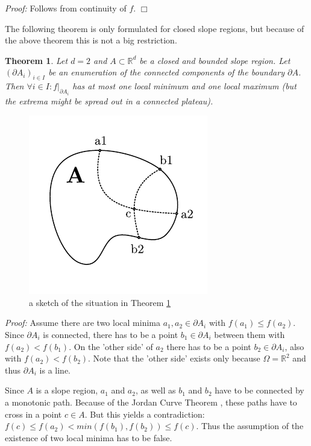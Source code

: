 \documentclass[11pt,twoside,twocolumn,a4paper]{article}
\theoremstyle{plain}
\newtheorem{thm}{Theorem}[section] %
\theoremstyle{definition}
\begin{document}
\emph{Proof:} Follows from continuity of $f$.
\hfill $\Box$

The following theorem is only formulated for closed slope regions, but because of the above theorem this is not a big restriction.

\begin{thm}
\label{uniqueminmax}
Let $d = 2$ and $A \subset \mathbb R^d$ be a closed and bounded slope region.
Let $(\partial A_i)_{i\in I}$ be an enumeration of the connected components of the boundary $\partial A$.
Then $\forall i \in I : f|_{\partial A_i}$ has at most one local minimum and one local maximum (but the extrema might be spread out in a connected plateau).
\end{thm}

\begin{figure}
\centering
\includegraphics[width=0.5\columnwidth]{img/sketch_border_thm.pdf}
\caption{a sketch of the situation in Theorem \ref{uniqueminmax}}
\label{fig:sketch_1}
\end{figure}

\emph{Proof:} Assume there are two local minima $a_1, a_2 \in \partial A_i$ with $f(a_1) \leq f(a_2)$.
Since $\partial A_i$ is connected, there has to be a point $b_1 \in \partial A_i$ between them with $f(a_2) < f(b_1)$.
On the 'other side' of $a_2$ there has to be a point $b_2 \in \partial A_i$, also with $f(a_2) < f(b_2)$.
Note that the 'other side' exists only because $\Omega = \mathbb R^2$ and thus $\partial A_i$ is a line.

Since $A$ is a slope region, $a_1$ and $a_2$, as well as $b_1$ and $b_2$ have to be connected by a monotonic path.
Because of the Jordan Curve Theorem \cite{jordan1887cours}, these paths have to cross in a point $c \in A$.
But this yields a contradiction: $f(c) \leq f(a_2) < min(f(b_1), f(b_2)) \leq f(c)$.
Thus the assumption of the existence of two local minima has to be false.
\end{document}
